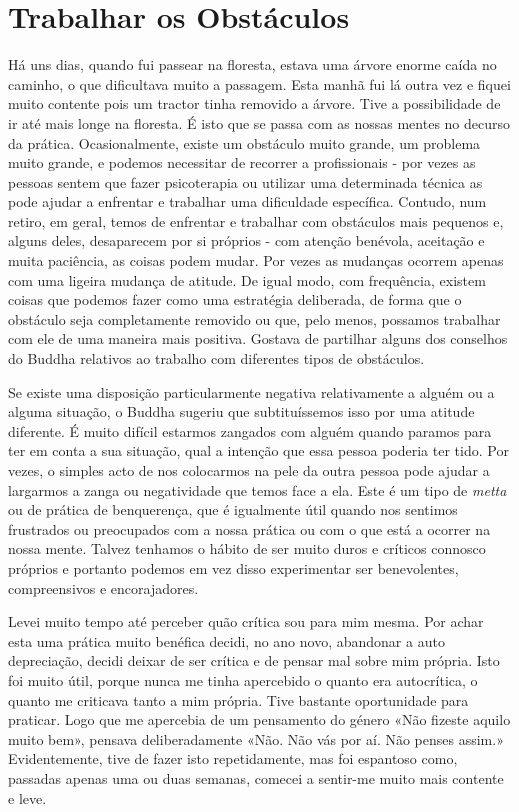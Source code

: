 \chapter{Trabalhar os Obstáculos}

Há uns dias, quando fui passear na floresta, estava uma árvore enorme
caída no caminho, o que dificultava muito a passagem. Esta manhã fui lá
outra vez e fiquei muito contente pois um tractor tinha removido a
árvore. Tive a possibilidade de ir até mais longe na floresta. É isto
que se passa com as nossas mentes no decurso da prática. Ocasionalmente,
existe um obstáculo muito grande, um problema muito grande, e podemos
necessitar de recorrer a profissionais - por vezes as pessoas sentem que
fazer psicoterapia ou utilizar uma determinada técnica as pode ajudar a
enfrentar e trabalhar uma dificuldade específica. Contudo, num retiro,
em geral, temos de enfrentar e trabalhar com obstáculos mais pequenos e,
alguns deles, desaparecem por si próprios - com atenção benévola,
aceitação e muita paciência, as coisas podem mudar. Por vezes as
mudanças ocorrem apenas com uma ligeira mudança de atitude. De igual
modo, com frequência, existem coisas que podemos fazer como uma
estratégia deliberada, de forma que o obstáculo seja completamente
removido ou que, pelo menos, possamos trabalhar com ele de uma maneira
mais positiva. Gostava de partilhar alguns dos conselhos do Buddha
relativos ao trabalho com diferentes tipos de obstáculos.

Se existe uma disposição particularmente negativa relativamente a alguém
ou a alguma situação, o Buddha sugeriu que subtituíssemos isso por uma
atitude diferente. É muito difícil estarmos zangados com alguém quando
paramos para ter em conta a sua situação, qual a intenção que essa
pessoa poderia ter tido. Por vezes, o simples acto de nos colocarmos na
pele da outra pessoa pode ajudar a largarmos a zanga ou negatividade que
temos face a ela. Este é um tipo de \emph{metta} ou de prática de
benquerença, que é igualmente útil quando nos sentimos frustrados ou
preocupados com a nossa prática ou com o que está a ocorrer na nossa
mente. Talvez tenhamos o hábito de ser muito duros e críticos connosco
próprios e portanto podemos em vez disso experimentar ser benevolentes,
compreensivos e encorajadores.

Levei muito tempo até perceber quão crítica sou para mim mesma. Por
achar esta uma prática muito benéfica decidi, no ano novo, abandonar a
auto depreciação, decidi deixar de ser crítica e de pensar mal sobre mim
própria. Isto foi muito útil, porque nunca me tinha apercebido o quanto
era autocrítica, o quanto me criticava tanto a mim própria. Tive
bastante oportunidade para praticar. Logo que me apercebia de um
pensamento do género «Não fizeste aquilo muito bem», pensava
deliberadamente «Não. Não vás por aí. Não penses assim.» Evidentemente,
tive de fazer isto repetidamente, mas foi espantoso como, passadas
apenas uma ou duas semanas, comecei a sentir-me muito mais contente e
leve.

